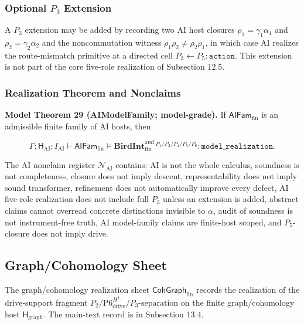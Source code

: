 \documentclass[11pt]{article}
\theoremstyle{definition}
\begin{document}
\subsubsection{\texorpdfstring{Optional \(P_{3}\) Extension}{D.3.4 Optional P\_\{3\} Extension}}

A \(P_{3}\) extension may be added by recording two AI host closures \(\rho_{1}=\gamma_{1}\alpha_{1}\) and \(\rho_{2}=\gamma_{2}\alpha_{2}\) and the noncommutation witness \(\rho_{1}\rho_{2}\neq\rho_{2}\rho_{1}\), in which case AI realizes the route-mismatch primitive at a directed cell \(P_{3}\leftarrow P_{5}:\texttt{action}\). This extension is not part of the core five-role realization of Subsection 12.5.

\subsubsection{Realization Theorem and Nonclaims}

\textbf{Model Theorem 29 (AIModelFamily; model-grade).} If \(\mathsf{AIFam}_{\mathrm{fin}}\) is an admissible finite family of AI hosts, then

\[
\Gamma;\mathsf H_{\mathrm{AI}};I_{\mathrm{AI}}\vdash\mathsf{AIFam}_{\mathrm{fin}}\models\mathbf{BirdInt}^{\mathrm{aud}}_{\mathrm{fin}}{}^{\,P_{1}/P_{2}/P_{4}/P_{5}/P_{6}}:\texttt{model\_realization}.
\]

The AI nonclaim register \(\mathcal N_{\mathrm{AI}}\) contains: AI is not the whole calculus, soundness is not completeness, closure does not imply descent, representability does not imply sound transformer, refinement does not automatically improve every defect, AI five-role realization does not include full \(P_{3}\) unless an extension is added, abstract claims cannot overread concrete distinctions invisible to \(\alpha\), audit of soundness is not instrument-free truth, AI model-family claims are finite-host scoped, and \(P_{5}\)-closure does not imply drive.

\subsection{Graph/Cohomology Sheet}

The graph/cohomology realization sheet \(\mathsf{CohGraph}_{\mathrm{fin}}\) records the realization of the drive-support fragment \(P_{2}/\mathrm{P6}_{\mathrm{drive}}^{H^{1}}/P_{3}\text{-separation}\) on the finite graph/cohomology host \(\mathsf H_{\mathrm{graph}}\). The main-text record is in Subsection 13.4.
\end{document}
